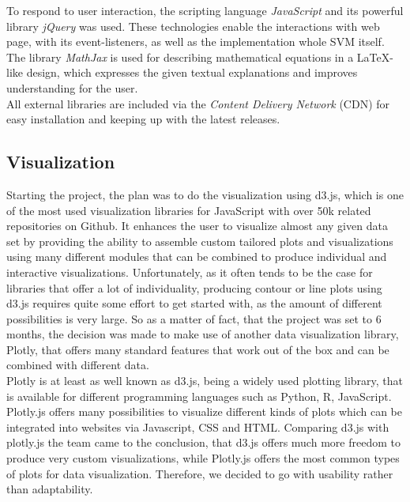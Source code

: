 \documentclass{scrartcl}
\begin{document}
To respond to user interaction, the scripting language \textit{JavaScript} and its powerful library \textit{jQuery} was used. These technologies enable the interactions with web page, with its event-listeners, as well as the implementation whole SVM itself.  \\

The library \textit{MathJax} is used for describing mathematical equations in a \LaTeX-like design, which expresses the given textual explanations and improves understanding for the user.\\

All external libraries are included via the \textit{Content Delivery Network} (CDN) for easy installation and keeping up with the latest releases.

\subsection{Visualization}

Starting the project, the plan was to do the visualization using d3.js, which is one of the most used visualization libraries for JavaScript with over 50k related repositories on Github. It enhances the user to visualize almost any given data set by providing the ability to assemble custom tailored plots and visualizations using many different modules that can be combined to produce individual and interactive visualizations. Unfortunately, as it often tends to be the case for libraries that offer a lot of individuality, producing contour or line plots using d3.js requires quite some effort to get started with, as the amount of different possibilities is very large. So as a matter of fact, that the project was set to 6 months, the decision was made to make use of another data visualization library, Plotly, that offers many standard features that work out of the box and can be combined with different data.\\

Plotly is at least as well known as d3.js, being a widely used plotting library, that is available for different programming languages such as Python, R, JavaScript. Plotly.js offers many possibilities to visualize different kinds of plots which can be integrated into websites via Javascript, CSS and HTML. Comparing d3.js with plotly.js the team came to the conclusion, that d3.js offers much more freedom to produce very custom visualizations, while Plotly.js offers the most common types of plots for data visualization. Therefore, we decided to go with usability rather than adaptability.\\
\end{document}
